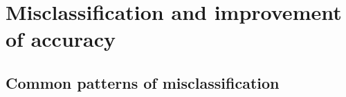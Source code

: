 \section{Misclassification and improvement of accuracy}\label{discussion:miclassification}
\subsection{Common patterns of misclassification}

